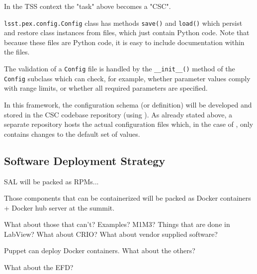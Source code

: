 In the TSS context the "task" above becomes a "CSC".

\texttt{lsst.pex.config.Config} class has methods \texttt{save()} and \texttt{load()} which persist and restore class instances from files, which just contain Python code. Note that because these files are Python code, it is easy to include documentation within the files.

The validation of a \texttt{Config} file is handled by the \texttt{\_\_init\_\_()} method of the \texttt{Config} subclass which can check, for example, whether parameter values comply with range limits, or whether all required parameters are specified.

In this framework, the configuration schema (or definition) will be developed and stored in the CSC codebase repository (using \pexC). As already stated above, a separate repository hosts the actual configuration files which, in the case of \pexC, only contains changes to the default set of values.



%


\subsection{Software Deployment Strategy}\label{sect:deploy}
SAL will be packed as RPMs...

Those components that can be containerized will be packed as Docker containers + Docker hub server at the summit.

What about those that can't? Examples? M1M3? Things that are done in LabView? What about CRIO? What about vendor supplied software?

Puppet can deploy Docker containers. What about the others?

What about the EFD?

